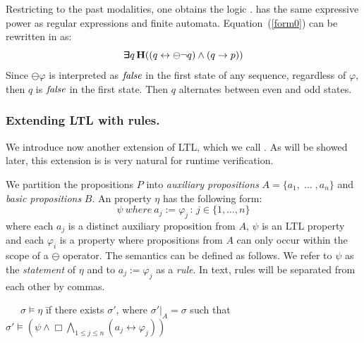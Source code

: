 Restricting \QLTL{} to the past modalities, one obtains the logic \QPLTL{}. \QPLTL{} has the same expressive
power as regular expressions and finite automata.
Equation~(\ref{form0}) can
be rewritten in \QPLTL{} as:
\begin{equation} \label{form1} \bm{\exists}\kern-0.6em\bm{\exists} q \,
{\bf H} (( q \leftrightarrow \ominus \neg q )   \wedge (q \rightarrow p ) )\end{equation}
Since $\ominus \varphi $ is interpreted as  $\mathit{false}$ in the first state of any sequence, regardless of $\varphi$, then
$q$ is $\mathit{false}$ in the first state. Then $q$ alternates between even and odd states.




\subsubsection{Extending LTL with rules.}

We introduce now another extension of LTL, which we call \ELTL{}.
As will be showed later, this extension is
is very natural for runtime verification.

We partition the propositions $P$ into
{\em auxiliary propositions} $A = \{ a_1 , \; \ldots\; , a_n \}$
and {\em basic propositions} $B$.
An \ELTL{} property $\eta$ has the following form: 
\begin{equation} \label{ELTL}
\psi \mathit{\ where\ } a_j  := \varphi_j \, : \, 
 {j \in \{1, \ldots , n\}} \end{equation}
where each $a_j$ is a distinct auxiliary proposition from $A$,
$\psi$ is an LTL property and each $\varphi_i$ 
is a \PLTL{} property where propositions from $A$ can
only occur within the scope of a $\ominus$ operator.
The semantics can be defined as follows. We refer to $\psi$
as the {\em statement} of $\eta$ and to 
$a_j  := \varphi_j$ as a {\em rule}. In text, rules
 will be separated from each other by commas. 
\begin{tabbing}
\ \ \ $\sigma \models \eta$ \=  if there exists $\sigma'$, where
$\sigma' |_A = \sigma$ such that \\
 \> $\sigma' \models ( \psi  \wedge   \Box \bigwedge_{1 \leq j \leq n} ( a_j \leftrightarrow \varphi_j)) $
\end{tabbing}

